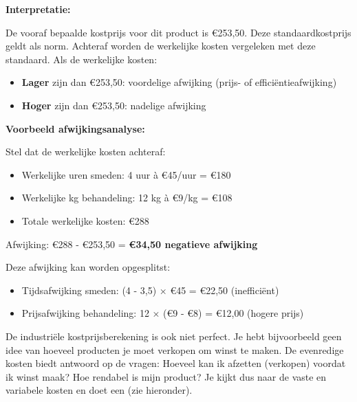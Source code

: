 \documentclass[a4paper,11pt]{article}
\begin{document}
\begin{description}
\begin{oefenblok}
              \textbf{Interpretatie:}

              De vooraf bepaalde kostprijs voor dit product is €253,50. Deze standaardkostprijs geldt als norm.
              Achteraf worden de werkelijke kosten vergeleken met deze standaard. Als de werkelijke kosten:
              \begin{itemize}
                  \item \textbf{Lager} zijn dan €253,50: voordelige afwijking (prijs- of efficiëntieafwijking)
                  \item \textbf{Hoger} zijn dan €253,50: nadelige afwijking
              \end{itemize}

              \textbf{Voorbeeld afwijkingsanalyse:}

              Stel dat de werkelijke kosten achteraf:
              \begin{itemize}
                  \item Werkelijke uren smeden: 4 uur à €45/uur = €180
                  \item Werkelijke kg behandeling: 12 kg à €9/kg = €108
                  \item Totale werkelijke kosten: €288
              \end{itemize}

              Afwijking: €288 - €253,50 = \textbf{€34,50 negatieve afwijking}

              Deze afwijking kan worden opgesplitst:
              \begin{itemize}
                  \item Tijdsafwijking smeden: (4 - 3,5) × €45 = €22,50 (inefficiënt)
                  \item Prijsafwijking behandeling: 12 × (€9 - €8) = €12,00 (hogere prijs)
              \end{itemize}
          \end{oefenblok}


    \item{}
          De industriële kostprijsberekening is ook niet perfect.
          Je hebt bijvoorbeeld geen idee van hoeveel producten
          je moet verkopen om winst te maken.
          De evenredige kosten biedt antwoord op de vragen:
          Hoeveel kan ik afzetten (verkopen) voordat ik winst maak?
          Hoe rendabel is mijn product?
          \newline
          Je kijkt dus naar de vaste en variabele kosten
          en doet een  (zie hieronder).
          \newline


\end{description}
\end{document}
